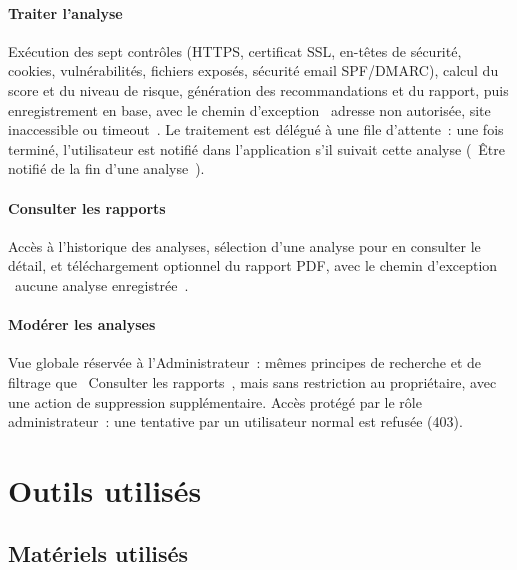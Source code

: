 
\paragraph{Traiter l'analyse}

Ex\'ecution des sept contr\^oles (HTTPS, certificat SSL, en-t\^etes de
s\'ecurit\'e, cookies, vuln\'erabilit\'es, fichiers expos\'es, s\'ecurit\'e email
SPF/DMARC), calcul du score et du niveau de risque, g\'en\'eration des
recommandations et du rapport, puis enregistrement en base, avec le chemin
d'exception \og~adresse non autoris\'ee, site inaccessible ou timeout~\fg. Le
traitement est d\'el\'egu\'e \`a une file d'attente~: une fois termin\'e,
l'utilisateur est notifi\'e dans l'application s'il suivait cette analyse
(\og~\^Etre notifi\'e de la fin d'une analyse~\fg).


\paragraph{Consulter les rapports}

Acc\`es \`a l'historique des analyses, s\'election d'une analyse pour en consulter
le d\'etail, et t\'el\'echargement optionnel du rapport PDF, avec le chemin
d'exception \og~aucune analyse enregistr\'ee~\fg.

\paragraph{Mod\'erer les analyses}

Vue globale r\'eserv\'ee \`a l'Administrateur~: m\^emes principes de recherche et
de filtrage que \og~Consulter les rapports~\fg, mais sans restriction au
propri\'etaire, avec une action de suppression suppl\'ementaire. Acc\`es prot\'eg\'e
par le r\^ole administrateur~: une tentative par un utilisateur normal est
refus\'ee (403).

\section{Outils utilis\'es}

\subsection{Mat\'eriels utilis\'es}

